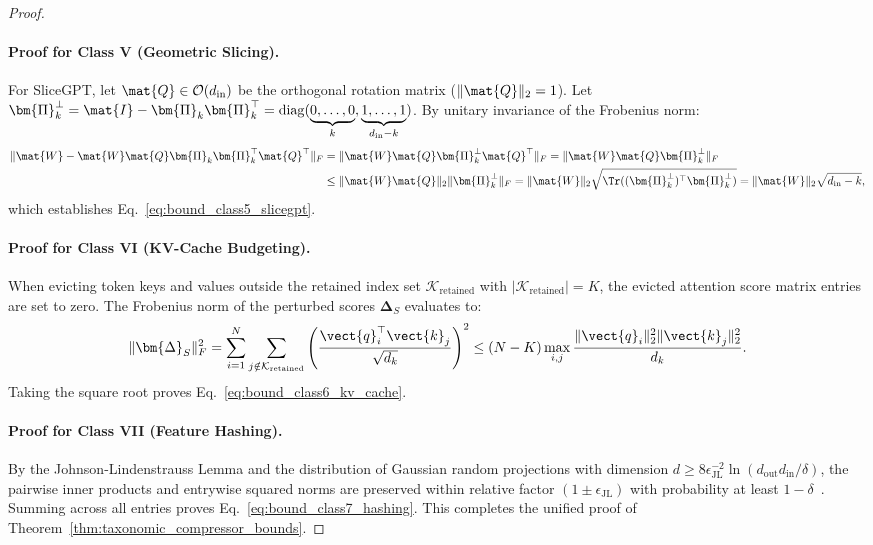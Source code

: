 \begin{proof}
\paragraph{Proof for Class V (Geometric Slicing).}
For SliceGPT, let $\mat{Q} \in \mathcal{O}(d_{\text{in}})$ be the orthogonal rotation matrix ($\|\mat{Q}\|_2 = 1$). Let $\bm{\Pi}_k^\perp = \mat{I} - \bm{\Pi}_k \bm{\Pi}_k^\top = \operatorname{diag}(\underbrace{0, \dots, 0}_{k}, \underbrace{1, \dots, 1}_{d_{\text{in}}-k})$. By unitary invariance of the Frobenius norm:
\begin{align}
\|\mat{W} - \mat{W} \mat{Q} \bm{\Pi}_k \bm{\Pi}_k^\top \mat{Q}^\top\|_F &= \|\mat{W} \mat{Q} \bm{\Pi}_k^\perp \mat{Q}^\top\|_F = \|\mat{W} \mat{Q} \bm{\Pi}_k^\perp\|_F \nonumber \\
&\le \|\mat{W} \mat{Q}\|_2 \|\bm{\Pi}_k^\perp\|_F = \|\mat{W}\|_2 \sqrt{\Tr((\bm{\Pi}_k^\perp)^\top \bm{\Pi}_k^\perp)} = \|\mat{W}\|_2 \sqrt{d_{\text{in}} - k},
\end{align}
which establishes Eq.~\eqref{eq:bound_class5_slicegpt}.

\paragraph{Proof for Class VI (KV-Cache Budgeting).}
When evicting token keys and values outside the retained index set $\mathcal{K}_{\text{retained}}$ with $|\mathcal{K}_{\text{retained}}| = K$, the evicted attention score matrix entries are set to zero. The Frobenius norm of the perturbed scores $\bm{\Delta}_S$ evaluates to:
\begin{equation}
\|\bm{\Delta}_S\|_F^2 = \sum_{i=1}^N \sum_{j \notin \mathcal{K}_{\text{retained}}} \left( \frac{\vect{q}_i^\top \vect{k}_j}{\sqrt{d_k}} \right)^2 \le (N - K) \max_{i, j} \frac{\|\vect{q}_i\|_2^2 \|\vect{k}_j\|_2^2}{d_k}.
\end{equation}
Taking the square root proves Eq.~\eqref{eq:bound_class6_kv_cache}.

\paragraph{Proof for Class VII (Feature Hashing).}
By the Johnson-Lindenstrauss Lemma and the distribution of Gaussian random projections with dimension $d \ge 8 \epsilon_{\text{JL}}^{-2} \ln(d_{\text{out}} d_{\text{in}} / \delta)$, the pairwise inner products and entrywise squared norms are preserved within relative factor $(1 \pm \epsilon_{\text{JL}})$ with probability at least $1 - \delta$~\cite{golub2013matrix}. Summing across all entries proves Eq.~\eqref{eq:bound_class7_hashing}.
This completes the unified proof of Theorem~\ref{thm:taxonomic_compressor_bounds}.
\end{proof}

